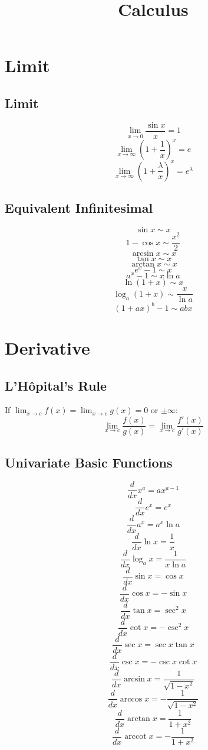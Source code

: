 \documentclass{article}
\title{Calculus}
\date{}
\begin{document}
\maketitle

\tableofcontents

\newpage
\section{Limit}

\subsection{Limit}

\[
    \lim_{x \to 0} \frac{\sin x}{x} = 1
\]
\[
    \lim_{x \to \infty} \left(1 + \frac{1}{x}\right)^x = e
\]
\[
    \lim_{x \to \infty} \left(1 + \frac{\lambda}{x}\right)^x = e^\lambda
\]

\subsection{Equivalent Infinitesimal}

\[
    \sin x \sim x
\]
\[
    1 - \cos x \sim \frac{x^2}{2}
\]
\[
    \arcsin x \sim x
\]
\[
    \tan x \sim x
\]
\[
    \arctan x \sim x
\]
\[
    e^x - 1 \sim x
\]
\[
    a^x - 1 \sim x \ln a
\]
\[
    \ln(1 + x) \sim x
\]
\[
    \log_a(1 + x) \sim \frac{x}{\ln a}
\]
\[
    (1 + ax)^b - 1 \sim abx
\]


\newpage
\section{Derivative}

\subsection{L'Hôpital's Rule}

If $\lim_{x \to c} f(x) = \lim_{x \to c} g(x) = 0$ or $\pm\infty$:
\[
    \lim_{x \to c} \frac{f(x)}{g(x)} = \lim_{x \to c} \frac{f'(x)}{g'(x)}
\]

\subsection{Univariate Basic Functions}

\[
    \frac{d}{dx} x^a = ax^{a-1}
\]
\[
    \frac{d}{dx} e^x = e^x
\]
\[
    \frac{d}{dx} a^x = a^x \ln a
\]
\[
    \frac{d}{dx} \ln x = \frac{1}{x}
\]
\[
    \frac{d}{dx} \log_a x = \frac{1}{x \ln a}
\]
\[
    \frac{d}{dx} \sin x = \cos x
\]
\[
    \frac{d}{dx} \cos x = -\sin x
\]
\[
    \frac{d}{dx} \tan x = \sec^2 x
\]
\[
    \frac{d}{dx} \cot x = -\csc^2 x
\]
\[
    \frac{d}{dx} \sec x = \sec x \tan x
\]
\[
    \frac{d}{dx} \csc x = -\csc x \cot x
\]
\[
    \frac{d}{dx} \arcsin x = \frac{1}{\sqrt{1 - x^2}}
\]
\[
    \frac{d}{dx} \arccos x = -\frac{1}{\sqrt{1 - x^2}}
\]
\[
    \frac{d}{dx} \arctan x = \frac{1}{1 + x^2}
\]
\[
    \frac{d}{dx} \operatorname{arccot} x = -\frac{1}{1 + x^2}
\]
\end{document}
